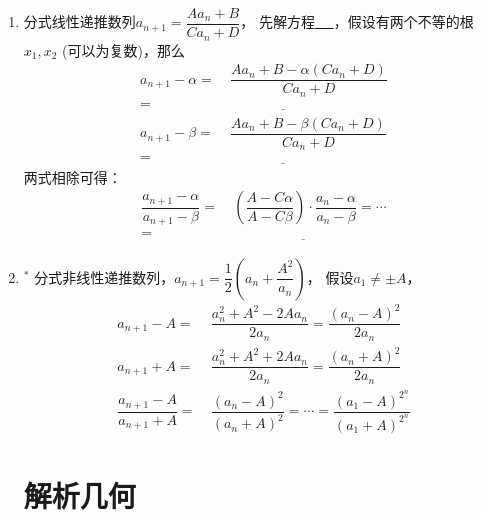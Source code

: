 \documentclass{article}
\newif\ifte
\begin{document}
\begin{multicols}{2}
\begin{enumerate}[leftmargin=20pt]
\item 分式线性递推数列$ a_{n+1}=\dfrac{Aa_n+B}{Ca_n+D} $，
先解方程\underline{\ \ifte $ x=\dfrac{Ax+B}{Cx+D} $
\else \hspace{2cm} \fi\ }，假设有两个不等的根$ x_1,x_2 $
(可以为复数)，那么
\begin{align*}
    a_{n+1}-\alpha =&\ \dfrac{Aa_n+B-\alpha(Ca_n+D)}{Ca_n+D}\\
    =&\ \underline{\ \ifte \dfrac{(A-C\alpha)(a_n-\alpha)}{Ca_n+D}
        \else \hspace{3cm} \fi\ } \\
    a_{n+1}-\beta =&\ \dfrac{Aa_n+B-\beta(Ca_n+D)}{Ca_n+D} \\
    =&\ \underline{\ \ifte \dfrac{(A-C\beta)(a_n-\beta)}{Ca_n+D}
        \else \hspace{3cm} \fi\ }	
\end{align*}
两式相除可得：
\begin{align*}
    \dfrac{a_{n+1}-\alpha}{a_{n+1}-\beta}
    =&\ \left( \dfrac{A-C\alpha}{A-C\beta}\right) \cdot 
    \dfrac{a_{n}-\alpha}{a_{n}-\beta}=\cdots \\
    =&\ \underline{\ \ifte \left( \dfrac{A-C\alpha}{A-C\beta}
       \right)^{n} \cdot \dfrac{a_{1}-\alpha}{a_{1}-\beta}
       \else \hspace{4cm} \fi\ }
\end{align*}

\item $^*$ 分式非线性递推数列，$ a_{n+1}=\dfrac{1}{2}\left(a_n+\dfrac{A^2}{a_n}\right) $，
假设$ a_1\neq \pm A $，
\begin{align*}
    a_{n+1}-A =&\ \dfrac{a_n^2+A^2-2Aa_n}{2a_n}=\dfrac{(a_n-A)^2}{2a_n} \\
    a_{n+1}+A =&\ \dfrac{a_n^2+A^2+2Aa_n}{2a_n}=\dfrac{(a_n+A)^2}{2a_n} \\
    \dfrac{a_{n+1}-A}{a_{n+1}+A} =&\ \dfrac{(a_{n}-A)^2}{(a_{n}+A)^2}=
    \cdots = \dfrac{(a_{1}-A)^{2^n}}{(a_{1}+A)^{2^n}}
\end{align*}

\section{解析几何}


\end{enumerate}
\end{multicols}
\end{document}
